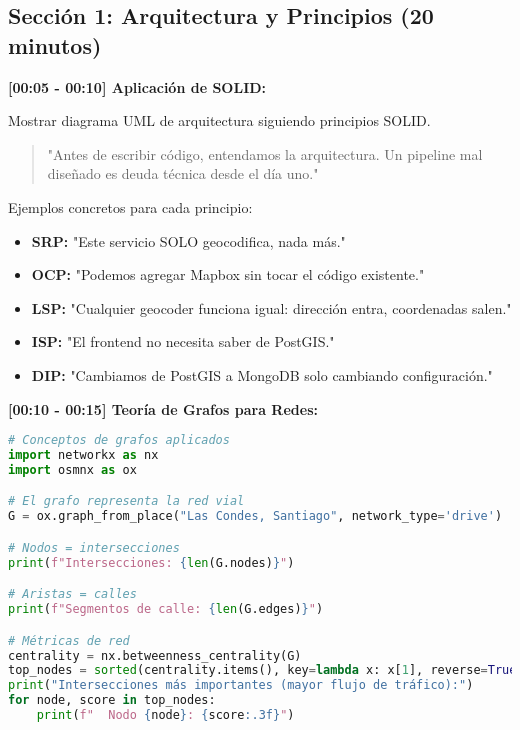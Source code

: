 \documentclass[11pt,a4paper]{article}
\begin{document}
\subsection{Sección 1: Arquitectura y Principios (20 minutos)}

\textbf{[00:05 - 00:10] Aplicación de SOLID:}

\begin{demobox}
Mostrar diagrama UML de arquitectura siguiendo principios SOLID.
\end{demobox}

\begin{quote}
    "Antes de escribir código, entendamos la arquitectura. Un pipeline mal diseñado es deuda técnica desde el día uno."
\end{quote}

Ejemplos concretos para cada principio:
\begin{itemize}
    \item \textbf{SRP:} "Este servicio SOLO geocodifica, nada más."
    \item \textbf{OCP:} "Podemos agregar Mapbox sin tocar el código existente."
    \item \textbf{LSP:} "Cualquier geocoder funciona igual: dirección entra, coordenadas salen."
    \item \textbf{ISP:} "El frontend no necesita saber de PostGIS."
    \item \textbf{DIP:} "Cambiamos de PostGIS a MongoDB solo cambiando configuración."
\end{itemize}

\textbf{[00:10 - 00:15] Teoría de Grafos para Redes:}

\begin{lstlisting}[language=Python]
# Conceptos de grafos aplicados
import networkx as nx
import osmnx as ox

# El grafo representa la red vial
G = ox.graph_from_place("Las Condes, Santiago", network_type='drive')

# Nodos = intersecciones
print(f"Intersecciones: {len(G.nodes)}")

# Aristas = calles
print(f"Segmentos de calle: {len(G.edges)}")

# Métricas de red
centrality = nx.betweenness_centrality(G)
top_nodes = sorted(centrality.items(), key=lambda x: x[1], reverse=True)[:5]
print("Intersecciones más importantes (mayor flujo de tráfico):")
for node, score in top_nodes:
    print(f"  Nodo {node}: {score:.3f}")
\end{lstlisting}
\end{document}
